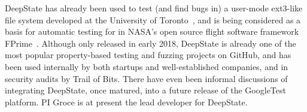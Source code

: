 DeepState has already been used to test (and find bugs in) a user-mode ext3-like file system developed at the University of Toronto~\cite{testfs,testfsrepo}, and is being considered as a basis for automatic testing for in NASA's open source flight software framework FPrime~\cite{fprime,fprimerepo}.  Although only released in early 2018, DeepState is already one of the most popular property-based testing and fuzzing projects on GitHub, and has been used internally by both startups and well-established companies, and in security audits by Trail of Bits.  There have even been informal discussions of integrating DeepState, once matured, into a future release of the GoogleTest~\cite{GoogleTest} platform.  PI Groce is at present the lead developer for DeepState.